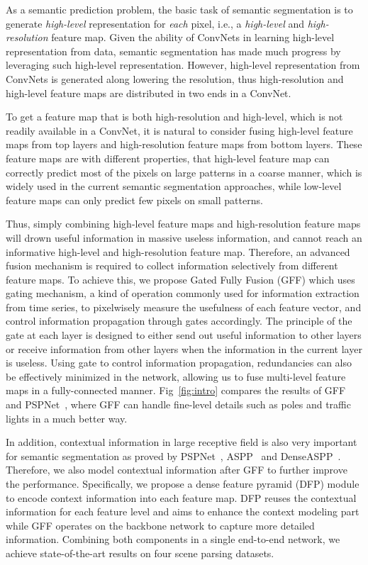 \documentclass[letterpaper]{article} \usepackage{aaai20}  \usepackage{times}  \usepackage{helvet} \usepackage{courier}  \usepackage[hyphens]{url}  \usepackage{graphicx} \urlstyle{rm} \def\UrlFont{\rm}  \usepackage{graphicx}  \usepackage{amsmath}
\begin{document}
As a semantic prediction problem, the basic task of semantic segmentation is to generate \emph{high-level} representation for \emph{each} pixel, i.e., a \emph{high-level} and \emph{high-resolution} feature map. Given the ability of ConvNets in learning high-level representation from data, semantic segmentation has made much progress by leveraging such high-level representation. However, high-level representation from ConvNets is generated along lowering the resolution, thus high-resolution and high-level feature maps are distributed in two ends in a ConvNet.

To get a feature map that is both high-resolution and high-level, which is not readily available in a ConvNet, it is natural to consider fusing high-level feature maps from top layers and high-resolution feature maps from bottom layers. These feature maps are with different properties, that high-level feature map can correctly predict most of the pixels on large patterns in a coarse manner, which is widely used in the current semantic segmentation approaches, while low-level feature maps can only predict few pixels on small patterns. 

Thus, simply combining high-level feature maps and high-resolution feature maps will drown useful information in massive useless information, and cannot reach an informative high-level and high-resolution feature map. Therefore, an advanced fusion mechanism is required to collect information selectively from different feature maps. To achieve this, we propose Gated Fully Fusion (GFF) which uses gating mechanism, a kind of operation commonly used for information extraction from time series, to pixelwisely measure the usefulness of each feature vector, and control information propagation through gates accordingly. The principle of the gate at each layer is designed to either send out useful information to other layers or receive information from other layers when the information in the current layer is useless. Using gate to control information propagation, redundancies can also be effectively minimized in the network, allowing us to fuse multi-level feature maps in a fully-connected manner.  Fig~\ref{fig:intro} compares the results of GFF and PSPNet~\cite{pspnet}, where GFF can handle fine-level details such as poles and traffic lights in a much better way.

In addition, contextual information in large receptive field is also very important for semantic segmentation as proved by PSPNet~\cite{pspnet}, ASPP~\cite{deeplabv2} and DenseASPP~\cite{denseaspp}. Therefore, we also model contextual information after GFF to further improve the performance. Specifically, we propose a dense feature pyramid (DFP) module to encode context information into each feature map. DFP reuses the contextual information for each feature level and aims to enhance the context modeling part while GFF operates on the backbone network to capture more detailed information. Combining both components in a single end-to-end network, we achieve state-of-the-art results on four scene parsing datasets.
\end{document}
